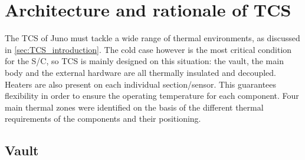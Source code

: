\section{Architecture and rationale of TCS}
\label{sec:TCS_architecture_rationale}

The TCS of Juno must tackle a wide range of thermal environments, as discussed in \autoref{sec:TCS_introduction}.
The cold case however is the most critical condition for the S/C, so TCS is mainly designed on this situation: the vault, the main body and the external hardware are all thermally insulated and decoupled. Heaters are also present on each individual section/sensor. This guarantees flexibility in order to ensure the operating temperature for each component.
Four main thermal zones were identified on the basis of the different thermal requirements of the components and their positioning.


\vspace*{-3mm}

\subsection{Vault}
\label{subsec:vault}

